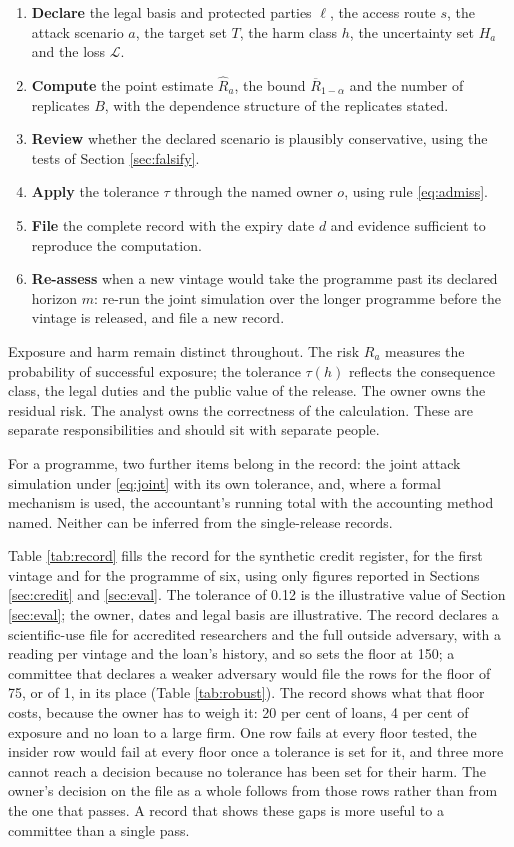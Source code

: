 \documentclass[11pt,a4paper]{article}
\theoremstyle{plain}
\theoremstyle{definition}
\theoremstyle{definition}
\theoremstyle{plain}
\begin{document}
\begin{enumerate}
\item \textbf{Declare} the legal basis and protected parties $\ell$, the access
route $s$, the attack scenario $a$, the target set $T$, the harm class $h$, the
uncertainty set $H_a$ and the loss $\mathcal{L}$.
\item \textbf{Compute} the point estimate $\widehat{R}_a$, the bound
$\overline{R}_{1-\alpha}$ and the number of replicates $B$, with the dependence structure
of the replicates stated.
\item \textbf{Review} whether the declared scenario is plausibly conservative,
using the tests of Section \ref{sec:falsify}.
\item \textbf{Apply} the tolerance $\tau$ through the named owner $o$, using
rule \eqref{eq:admiss}.
\item \textbf{File} the complete record with the expiry date $d$ and evidence
sufficient to reproduce the computation.
\item \textbf{Re-assess} when a new vintage would take the programme past its
declared horizon $m$: re-run the joint simulation over the longer programme
before the vintage is released, and file a new record.
\end{enumerate}

Exposure and harm remain distinct throughout. The risk $R_a$ measures the
probability of successful exposure; the tolerance $\tau(h)$ reflects the
consequence class, the legal duties and the public value of the release. The
owner owns the residual risk. The analyst owns the correctness of the
calculation. These are separate responsibilities and should sit with separate
people.

For a programme, two further items belong in the record: the joint attack
simulation under \eqref{eq:joint} with its own tolerance, and, where a formal
mechanism is used, the accountant's running total with the accounting method
named. Neither can be inferred from the single-release records.

Table \ref{tab:record} fills the record for the synthetic credit register, for
the first vintage and for the programme of six, using only figures reported in
Sections \ref{sec:credit} and \ref{sec:eval}. The tolerance of 0.12 is the
illustrative value of Section \ref{sec:eval}; the owner, dates and legal basis
are illustrative. The record declares a scientific-use file for accredited
researchers and the full outside adversary, with a reading per vintage and the
loan's history, and so sets the floor at 150; a committee that declares a weaker
adversary would file the rows for the floor of 75, or of 1, in its place (Table
\ref{tab:robust}). The record shows what that floor costs, because the owner has
to weigh it: 20 per cent of loans, 4 per cent of exposure and no loan to a large
firm. One row fails at every floor tested, the insider row would fail at every
floor once a tolerance is set for it, and three more cannot reach a decision
because no tolerance has been set for their harm. The owner's decision on the
file as a whole follows from those rows rather than from the one that passes. A record
that shows these gaps is more useful to a committee than a single pass.
\end{document}
